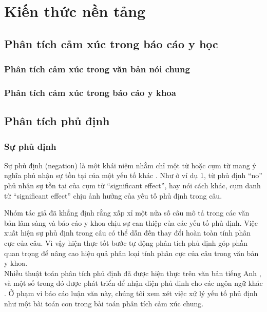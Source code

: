 \section{Kiến thức nền tảng}
\subsection{Phân tích cảm xúc trong báo cáo y học}
\subsubsection*{Phân tích cảm xúc trong văn bản nói chung}
\subsubsection*{Phân tích cảm xúc trong báo cáo y khoa}

\subsection{Phân tích phủ định}
\subsubsection*{Sự phủ định}
Sự phủ định (negation) là một khái niệm nhằm chỉ một từ hoặc cụm từ mang ý nghĩa phủ nhận sự tồn tại của một yếu tố khác \cite{skeppstedt2016marker}. Như ở ví dụ 1, từ phủ định ``no'' phủ nhận sự tồn tại của cụm từ ``significant effect'', hay nói cách khác, cụm danh từ ``significant effect'' chịu ảnh hưởng của yếu tố phủ định trong câu. 


Nhóm tác giả \cite{chapman2001evaluation} đã khẳng định rằng xấp xỉ một nửa số câu mô tả trong các văn bản lâm sàng và báo cáo y khoa chịu sự can thiệp của các yếu tố phủ định. Việc xuất hiện sự phủ định trong câu có thể dẫn đến thay đổi hoàn toàn tính phân cực của câu. Vì vậy hiện thực tốt bước tự động phân tích phủ định góp phần quan trọng để nâng cao hiệu quả phân loại tính phân cực của câu trong văn bản y khoa.\\

Nhiều thuật toán phân tích phủ định đã được hiện thực trên văn bản tiếng Anh \cite{Aronow1999, chapman2001evaluation, Mutalik2001, Elkin2005, Zeng2007}, và một số trong đó được phát triển để nhận diện phủ định cho các ngôn ngữ khác \cite{benamara2012how, costumero2014an, Chapman2013, CruzDiaz2015, gindl2006negation}. Ở phạm vi báo cáo luận văn này, chúng tôi xem xét việc xử lý yếu tố phủ định như một bài toán con trong bài toán phân tích cảm xúc chung.

